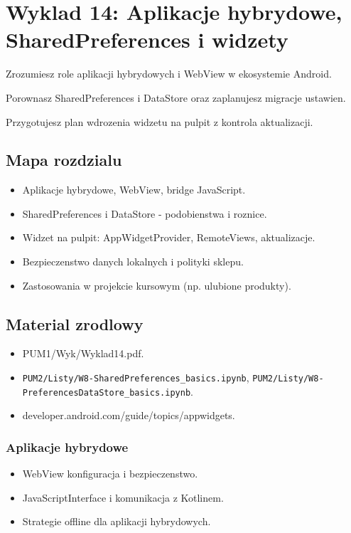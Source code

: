 \chapter{Wyklad 14: Aplikacje hybrydowe, SharedPreferences i widzety}

\begin{learningobjectives}
  \item Zrozumiesz role aplikacji hybrydowych i WebView w ekosystemie Android.
  \item Porownasz SharedPreferences i DataStore oraz zaplanujesz migracje ustawien.
  \item Przygotujesz plan wdrozenia widzetu na pulpit z kontrola aktualizacji.
\end{learningobjectives}

\section{Mapa rozdzialu}
\begin{itemize}
  \item Aplikacje hybrydowe, WebView, bridge JavaScript.
  \item SharedPreferences i DataStore - podobienstwa i roznice.
  \item Widzet na pulpit: AppWidgetProvider, RemoteViews, aktualizacje.
  \item Bezpieczenstwo danych lokalnych i polityki sklepu.
  \item Zastosowania w projekcie kursowym (np. ulubione produkty).
\end{itemize}

\section{Material zrodlowy}
\begin{itemize}
  \item PUM1/Wyk/Wyklad14.pdf.
  \item \texttt{PUM2/Listy/W8-SharedPreferences\_basics.ipynb}, \texttt{PUM2/Listy/W8-PreferencesDataStore\_basics.ipynb}.
  \item developer.android.com/guide/topics/appwidgets.
\end{itemize}

\subsection{Aplikacje hybrydowe}
\begin{itemize}
  \item WebView konfiguracja i bezpieczenstwo.
  \item JavaScriptInterface i komunikacja z Kotlinem.
  \item Strategie offline dla aplikacji hybrydowych.
\end{itemize}

